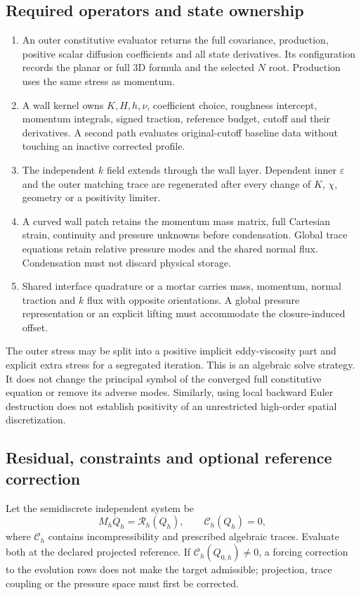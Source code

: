 \documentclass[11pt,a4paper]{article}
\numberwithin{equation}{section}
\newcommand{\eps}{\varepsilon}
\begin{document}
\subsection{Required operators and state ownership}
\begin{enumerate}
\item An outer constitutive evaluator returns the full covariance,
production, positive scalar diffusion coefficients and all state
derivatives. Its configuration records the planar or full 3D formula
and the selected $N$ root. Production uses the same stress as momentum.
\item A wall kernel owns $K,H,h,\nu$, coefficient choice, roughness
intercept, momentum integrals, signed traction, reference budget,
cutoff and their derivatives. A second path evaluates original-cutoff
baseline data without touching an inactive corrected profile.
\item The independent $k$ field extends through the wall layer.
Dependent inner $\eps$ and the outer matching trace are regenerated
after every change of $K$, $\chi$, geometry or a positivity limiter.
\item A curved wall patch retains the momentum mass matrix, full
Cartesian strain, continuity and pressure unknowns before condensation.
Global trace equations retain relative pressure modes and the shared
normal flux. Condensation must not discard physical storage.
\item Shared interface quadrature or a mortar carries mass, momentum,
normal traction and $k$ flux with opposite orientations. A global
pressure representation or an explicit lifting must accommodate the
closure-induced offset.
\end{enumerate}
The outer stress may be split into a positive implicit eddy-viscosity
part and explicit extra stress for a segregated iteration. This is
an algebraic solve strategy. It does not change the principal symbol
of the converged full constitutive equation or remove its adverse modes.
Similarly, using local backward Euler destruction does not establish
positivity of an unrestricted high-order spatial discretization.

\subsection{Residual, constraints and optional reference correction}
Let the semidiscrete independent system be
\begin{equation}
 M_h\dot Q_h=\mathcal R_h(Q_h),\qquad
 \mathcal C_h(Q_h)=0,
 \label{eq:semidiscrete}
\end{equation}
where $\mathcal C_h$ contains incompressibility and prescribed algebraic
traces. Evaluate both at the declared projected reference.
If $\mathcal C_h(Q_{0,h})\ne0$, a forcing correction to the evolution
rows does not make the target admissible; projection, trace coupling
or the pressure space must first be corrected.
\end{document}
